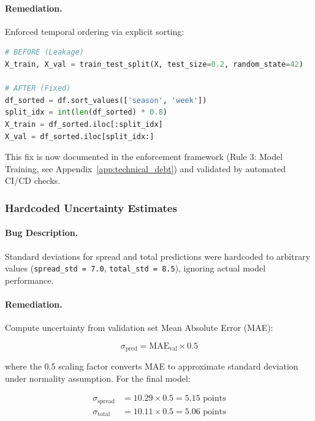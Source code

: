 \paragraph{Remediation.}
Enforced temporal ordering via explicit sorting:

\begin{lstlisting}[language=Python,style=codestyle,caption={Temporal Split Fix},label={lst:temporal-split-fix}]
# BEFORE (Leakage)
X_train, X_val = train_test_split(X, test_size=0.2, random_state=42)

# AFTER (Fixed)
df_sorted = df.sort_values(['season', 'week'])
split_idx = int(len(df_sorted) * 0.8)
X_train = df_sorted.iloc[:split_idx]
X_val = df_sorted.iloc[split_idx:]
\end{lstlisting}

This fix is now documented in the enforcement framework (Rule 3: Model Training, see Appendix~\ref{app:technical_debt}) and validated by automated CI/CD checks.

\subsubsection{Hardcoded Uncertainty Estimates}

\paragraph{Bug Description.}
Standard deviations for spread and total predictions were hardcoded to arbitrary values (\texttt{spread\_std = 7.0}, \texttt{total\_std = 8.5}), ignoring actual model performance.

\paragraph{Remediation.}
Compute uncertainty from validation set Mean Absolute Error (MAE):

\begin{equation}
\sigma_{\text{pred}} = \text{MAE}_{\text{val}} \times 0.5
\label{eq:validation-uncertainty}
\end{equation}

where the 0.5 scaling factor converts MAE to approximate standard deviation under normality assumption. For the final model:

\begin{align}
\sigma_{\text{spread}} &= 10.29 \times 0.5 = 5.15 \text{ points} \\
\sigma_{\text{total}} &= 10.11 \times 0.5 = 5.06 \text{ points}
\end{align}

